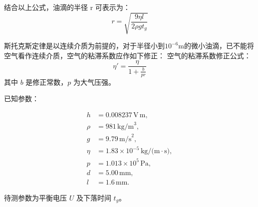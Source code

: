 \documentclass[12pt,a4paper,UTF8]{ctexart}
\begin{document}
\begin{enumerate}
结合以上公式，油滴的半径 r 可表示为：
\begin{equation}
    r = \sqrt{\frac{9 \eta l}{2 \rho g t_g}}
\end{equation}

斯托克斯定律是以连续介质为前提的，对于半径小到$10^{-6}$m的微小油滴，已不能将空气看作连续介质，空气的粘滞系数应作如下修正：
空气的粘滞系数修正公式：\begin{equation}
    \eta' =  \frac{\eta}{1 + \frac{b}{p r}}
\end{equation}
其中 $b$ 是修正常数，$p$ 为大气压强。

已知参数：

\begin{align*}
h &= 0.008237\, \text{V} \, \text{m}, \\
\rho &= 981 \, \text{kg/m}^3, \\
g &= 9.79 \, \text{m/s}^2, \\
\eta &= 1.83 \times 10^{-5} \, \text{kg/(m} \cdot \text{s)}, \\
p &= 1.013 \times 10^5 \, \text{Pa}, \\
d &= 5.00 \, \text{mm}, \\
l &= 1.6 \, \text{mm}.
\end{align*}

待测参数为平衡电压 $U$ 及下落时间 $t_g$。

\end{enumerate}
\end{document}
